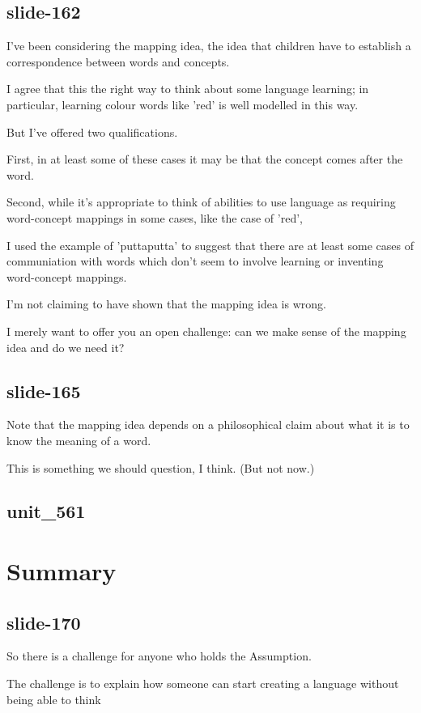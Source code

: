 \documentclass[12pt,\papersize]{extarticle}
\begin{document}
\subsection{slide-162}
I've been considering the mapping idea, the idea that children have to establish a correspondence between words and concepts.
 
I agree that this the right way to think about some language learning; in particular, learning colour words like 'red' is well modelled in this way.
 
But I've offered two qualifications.
 
First, in at least some of these cases it may be that the concept comes after the word.
 
Second, while it's appropriate to think of abilities to use language as requiring word-concept mappings in some cases, like the case of 'red',
 
I used the example of 'puttaputta' to suggest that there are at least some cases of communiation with words which don't seem to involve learning or inventing word-concept mappings.
 
I'm not claiming to have shown that the mapping idea is wrong.
 
I merely want to offer you an open challenge: can we make sense of the mapping idea and do we need it?
 
\subsection{slide-165}
Note that the mapping idea depends on a philosophical claim about what it is to know the meaning of a word.
 
This is something we should question, I think.  (But not now.)
 
\subsection{unit\_561}
 
 
\section{Summary}
 
\subsection{slide-170}
So there is a challenge for anyone who holds the Assumption.
 
The challenge is to explain how someone can start creating a language without being able to think
 
\end{document}
